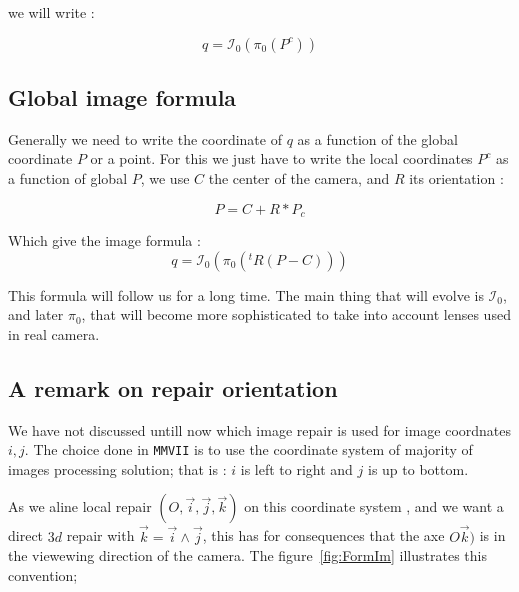 we will write :

\begin{equation}
	q  =   \mathcal{I}_0 (\pi_0 (P^c))
\end{equation}


\subsection{Global image formula}

Generally we need to write the coordinate of $q$ as a function of the global coordinate $P$ or a point.
For this we just have to write the local coordinates $P^c$ as a function of global $P$, 
we use $C$ the center of the camera, and $R$ its orientation :

\begin{equation}
	P =  C+ R *P_c
\end{equation}

Which give the image formula :
\begin{equation}
	q  =   \mathcal{I}_0 (\pi_0 (^t R (P - C))) \label{FormImage0}
\end{equation}

This formula will follow us for a long time. The main thing that will evolve is $\mathcal{I}_0$,
and later $\pi_0$,
that will become more sophisticated to take into account lenses used in real camera.


\subsection{A remark on repair orientation}

We have not discussed untill now which image repair is used for image coordnates $i,j$.
The choice done in {\tt MMVII} is to use the coordinate system of majority of images
processing solution; that is : $i$ is left to right and $j$ is up to bottom.

As we aline  local repair $(O,\vec{i},\vec{j},\vec{k})$  on this coordinate system ,
and we want a direct $3d$ repair with $\vec{k} = \vec{i} \wedge \vec{j} $, this
has for consequences that the axe $O\vec{k})$ is in the viewewing direction of the
camera.  The figure~\ref{fig:FormIm} illustrates this convention;


